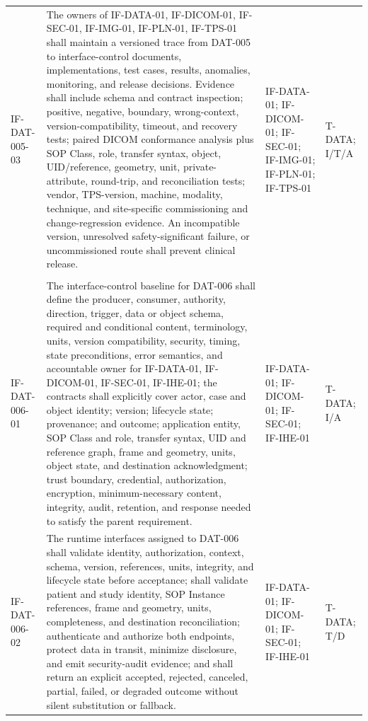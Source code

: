 \documentclass[11pt,letterpaper]{article}
\begin{document}
\begin{scriptsize}
\begin{longtable}{@{}L{0.14\textwidth}L{0.49\textwidth}L{0.19\textwidth}L{0.10\textwidth}@{}}
\addlinespace[2pt]
\mbox{IF-DAT-005-03} & The owners of IF-DATA-01, IF-DICOM-01, IF-SEC-01, IF-IMG-01, IF-PLN-01, IF-TPS-01 shall maintain a versioned trace from DAT-005 to interface-control documents, implementations, test cases, results, anomalies, monitoring, and release decisions. Evidence shall include schema and contract inspection; positive, negative, boundary, wrong-context, version-compatibility, timeout, and recovery tests; paired DICOM conformance analysis plus SOP Class, role, transfer syntax, object, UID\slash\allowbreak{}reference, geometry, unit, private-attribute, round-trip, and reconciliation tests; vendor, TPS-version, machine, modality, technique, and site-specific commissioning and change-regression evidence. An incompatible version, unresolved safety-significant failure, or uncommissioned route shall prevent clinical release. & IF-DATA-01; IF-DICOM-01; IF-SEC-01; IF-IMG-01; IF-PLN-01; IF-TPS-01 & T-DATA; I\slash\allowbreak{}T\slash\allowbreak{}A \\
\addlinespace[2pt]
 \\
\addlinespace[2pt]
\mbox{IF-DAT-006-01} & The interface-control baseline for DAT-006 shall define the producer, consumer, authority, direction, trigger, data or object schema, required and conditional content, terminology, units, version compatibility, security, timing, state preconditions, error semantics, and accountable owner for IF-DATA-01, IF-DICOM-01, IF-SEC-01, IF-IHE-01; the contracts shall explicitly cover actor, case and object identity; version; lifecycle state; provenance; and outcome; application entity, SOP Class and role, transfer syntax, UID and reference graph, frame and geometry, units, object state, and destination acknowledgment; trust boundary, credential, authorization, encryption, minimum-necessary content, integrity, audit, retention, and response needed to satisfy the parent requirement. & IF-DATA-01; IF-DICOM-01; IF-SEC-01; IF-IHE-01 & T-DATA; I\slash\allowbreak{}A \\
\addlinespace[2pt]
\mbox{IF-DAT-006-02} & The runtime interfaces assigned to DAT-006 shall validate identity, authorization, context, schema, version, references, units, integrity, and lifecycle state before acceptance; shall validate patient and study identity, SOP Instance references, frame and geometry, units, completeness, and destination reconciliation; authenticate and authorize both endpoints, protect data in transit, minimize disclosure, and emit security-audit evidence; and shall return an explicit accepted, rejected, canceled, partial, failed, or degraded outcome without silent substitution or fallback. & IF-DATA-01; IF-DICOM-01; IF-SEC-01; IF-IHE-01 & T-DATA; T\slash\allowbreak{}D \\

\end{longtable}
\end{scriptsize}
\end{document}
